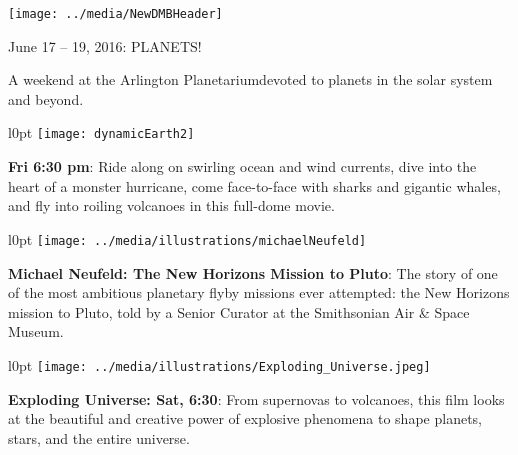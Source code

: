 \documentclass{article}
\begin{document}
\texttt{[image: ../media/NewDMBHeader]}
   \begin{centering}
     {\fontsize{28}{8}
  
        June 17 – 19, 2016: PLANETS!
     }

     {\fontsize{19}{19}
      
        A weekend at the Arlington Planetarium\break devoted to 
        planets in the solar system and beyond.

     }
  
   \end{centering}


     {\fontsize{20}{22}

     \begin{wrapfigure}[5]{l}{0pt}
       \texttt{[image: dynamicEarth2]}
     \end{wrapfigure}      
     
      \textbf{Fri  6:30 pm}: Ride along on swirling ocean and wind currents, dive into the heart of a monster hurricane, come face-to-face with sharks and gigantic whales, and fly into roiling volcanoes in this full-dome movie.

       }
       

   {\fontsize{20}{24}

   \begin{wrapfigure}[3]{l}{0pt}
      \texttt{[image: ../media/illustrations/michaelNeufeld]}
   \end{wrapfigure}      
   
   \textbf{Michael Neufeld: The New Horizons Mission to Pluto}: 
      The story of one of the most ambitious planetary flyby missions ever attempted: the New Horizons mission to Pluto,
      told by a Senior Curator at the Smithsonian Air \& Space Museum.
      
   }


   {\fontsize{18}{20}


 \begin{wrapfigure}[6]{l}{0pt}
   \texttt{[image: ../media/illustrations/Exploding\_Universe.jpeg]}
 \end{wrapfigure}      

     \textbf{Exploding Universe: Sat, 6:30}: From supernovas to volcanoes, this film looks at the beautiful and creative power of explosive phenomena to shape planets, stars, and the entire universe.

   }
\end{document}
